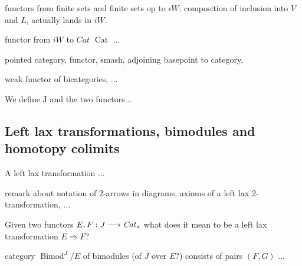   \begin{defn}\label{def_functors_finite_sets_to_iW}
    functors from finite sets and finite sets op to $iW$: composition of inclusion into $V$ and $L$, actually lands in $iW$.
  \end{defn}

  \begin{defn}\label{def_functor_iW_to_Cat}
    functor from $iW$ to $Cat$ $\operatorname{Cat}$ ...
  \end{defn}

  \begin{defn}\label{def_pointed_stuff}
    pointed category, functor, smash, adjoining basepoint to category,
  \end{defn}

  \begin{defn}\label{def_added_basepoint_extending_functor}
    weak functor of bicategories, ...
  \end{defn}

  \begin{defn}\label{def_J_and_functors_from_finite_sets_to_pointed_categories}
    We define J and the two functors...
  \end{defn}

  \subsection{Left lax transformations, bimodules and homotopy colimits}

    \begin{defn}\label{def_left_lax_transformation}
      A left lax transformation ...
    \end{defn}

    \begin{rem}\label{rem_left_lax_transformation}
      remark about notation of 2-arrows in diagrams, axioms of a left lax 2-transformation, ...
    \end{rem}

    \begin{rem}\label{rem_left_lax_transform_functors_J_to_Cat}
      Given two functors $E,F: J \longrightarrow \mathit{Cat}_*$ what does it mean to be a left lax transformation $E \Rightarrow F$?
    \end{rem}

    \begin{defn}\label{def_category_of_bimodules}
      category $\operatorname{Bimod}^J / E$ of bimodules (of $J$ over $E$?) consists of pairs $(F,G)$ ...
    \end{defn}

